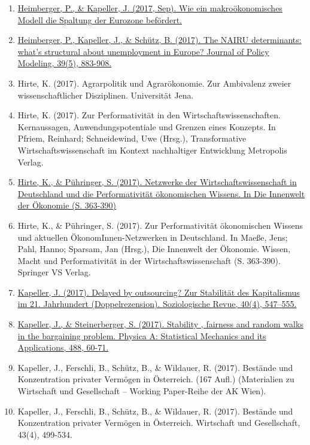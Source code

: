 \begin{enumerate}
	 \item \href{https://makronom.de/wie-ein-makrooekonomisches-modell-der-eu-kommission-die-spaltung-der-eurozone-befoerdert-22816}{Heimberger, P., \& Kapeller, J. (2017, Sep). Wie ein makroökonomisches Modell die Spaltung der Eurozone befördert.}
	 \item \href{https://doi.org/10.1016/j.jpolmod.2017.04.003}{Heimberger, P., Kapeller, J., \& Schütz, B. (2017). The NAIRU determinants: what’s structural about unemployment in Europe? Journal of Policy Modeling, 39(5), 883-908.}
	 \item Hirte, K. (2017). Agrarpolitik und Agrarökonomie. Zur Ambivalenz zweier wissenschaftlicher Disziplinen. Universität Jena.
	 \item Hirte, K. (2017). Zur Performativität in den Wirtschaftswissenschaften. Kernaussagen, Anwendungspotentiale und Grenzen eines Konzepts. In Pfriem, Reinhard; Schneidewind, Uwe (Hrsg.), Transformative Wirtschaftswissenschaft im Kontext nachhaltiger Entwicklung Metropolis Verlag.
	 \item \href{https://doi.org/10.1007/978-3-658-10428-3_15}{Hirte, K., \& Pühringer, S. (2017). Netzwerke der Wirtschaftswissenschaft in Deutschland und die Performativität ökonomischen Wissens. In Die Innenwelt der Ökonomie (S. 363-390)}
	 \item Hirte, K., \& Pühringer, S. (2017). Zur Performativität ökonomischen Wissens und aktuellen ÖkonomInnen-Netzwerken in Deutschland. In Maeße, Jens; Pahl, Hanno; Sparsam, Jan (Hrsg.), Die Innenwelt der Ökonomie. Wissen, Macht und Performativität in der Wirtschaftswissenschaft (S. 363-390). Springer VS Verlag.
	 \item \href{https://doi.org/10.1515/srsr-2017-0072}{Kapeller, J. (2017). Delayed by outsourcing? Zur Stabilität des Kapitalismus im 21. Jahrhundert (Doppelrezension). Soziologische Revue, 40(4), 547–555.}
	 \item \href{https://doi.org/10.1016/j.physa.2017.07.008}{Kapeller, J., \& Steinerberger, S. (2017). Stability , fairness and random walks in the bargaining problem. Physica A: Statistical Mechanics and its Applications, 488, 60-71.}
	 \item Kapeller, J., Ferschli, B., Schütz, B., \& Wildauer, R. (2017). Bestände und Konzentration privater Vermögen in Österreich. (167 Aufl.) (Materialien zu Wirtschaft und Gesellschaft -- Working Paper-Reihe der AK Wien).
	 \item Kapeller, J., Ferschli, B., Schütz, B., \& Wildauer, R. (2017). Bestände und Konzentration privater Vermögen in Österreich. Wirtschaft und Gesellschaft, 43(4), 499-534.

\end{enumerate}
